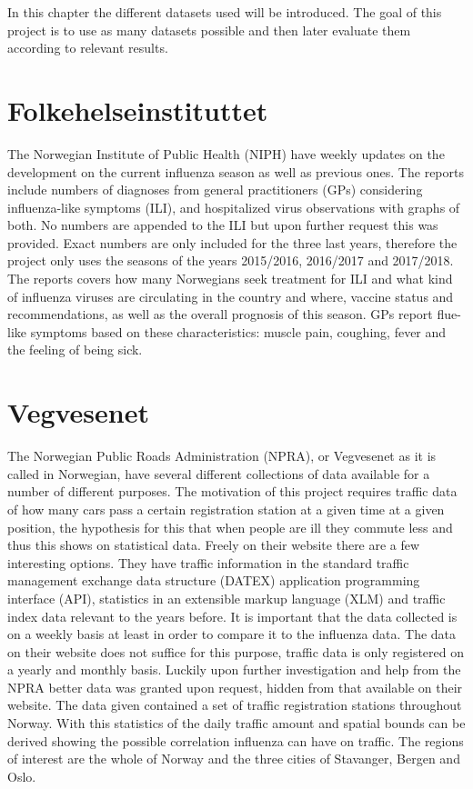 In this chapter the different datasets used will be introduced. The goal of this project is to use as many datasets possible and then later evaluate them according to relevant results.

\section{Folkehelseinstituttet}
The Norwegian Institute of Public Health (NIPH) have weekly updates\cite{fhi} on the development on the current influenza season as well as previous ones. The reports include numbers of diagnoses from general practitioners (GPs) considering influenza-like symptoms (ILI), and hospitalized virus observations with graphs of both. No numbers are appended to the ILI but upon further request this was provided. Exact numbers are only included for the three last years, therefore the project only uses the seasons of the years 2015/2016, 2016/2017 and 2017/2018. The reports covers how many Norwegians seek treatment for ILI and what kind of influenza viruses are circulating in the country and where, vaccine status and recommendations, as well as the overall prognosis of this season. GPs report flue-like symptoms based on these characteristics: muscle pain, coughing, fever and the feeling of being sick.

\section{Vegvesenet}
The Norwegian Public Roads Administration (NPRA), or Vegvesenet as it is called in Norwegian, have several different collections of data available for a number of different purposes. The motivation of this project requires traffic data of how many cars pass a certain registration station at a given time at a given position, the hypothesis for this that when people are ill they commute less and thus this shows on statistical data. Freely on their website \cite{vegvesenet} there are a few interesting options. They have traffic information in the standard traffic management exchange data structure (DATEX) application programming interface (API), statistics in an extensible markup language (XLM) and traffic index data relevant to the years before. It is important that the data collected is on a weekly basis at least in order to compare it to the influenza data. The data on their website does not suffice for this purpose, traffic data is only registered on a yearly and monthly basis. Luckily upon further investigation and help from the NPRA better data was granted upon request, hidden from that available on their website. The data given contained a set of traffic registration stations throughout Norway. With this statistics of the daily traffic amount and spatial bounds can be derived showing the possible correlation influenza can have on traffic. The regions of interest are the whole of Norway and the three cities of Stavanger, Bergen and Oslo.

